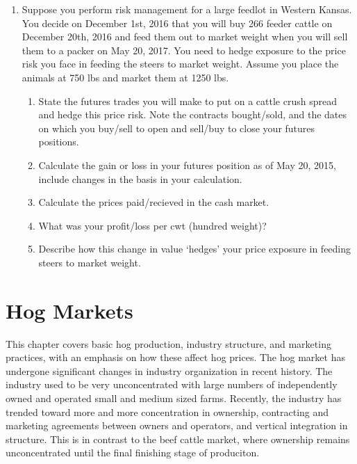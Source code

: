 \documentclass[
]{book}
\providecommand{\tightlist}{%
  \setlength{\itemsep}{0pt}\setlength{\parskip}{0pt}}
\begin{document}
\begin{enumerate}
\def\labelenumi{\arabic{enumi}.}
\item
  Suppose you perform risk management for a large feedlot in Western Kansas. You decide on December 1st, 2016 that you will buy 266 feeder cattle on December 20th, 2016 and feed them out to market weight when you will sell them to a packer on May 20, 2017. You need to hedge exposure to the price risk you face in feeding the steers to market weight. Assume you place the animals at 750 lbs and market them at 1250 lbs.

  \begin{enumerate}
  \def\labelenumii{\alph{enumii}.}
  \tightlist
  \item
    State the futures trades you will make to put on a cattle crush spread and hedge this price risk. Note the contracts bought/sold, and the dates on which you buy/sell to open and sell/buy to close your futures positions.
  \item
    Calculate the gain or loss in your futures position as of May 20, 2015, include changes in the basis in your calculation.
  \item
    Calculate the prices paid/recieved in the cash market.
  \item
    What was your profit/loss per cwt (hundred weight)?
  \item
    Describe how this change in value `hedges' your price exposure in feeding steers to market weight.
  \end{enumerate}
\end{enumerate}

\hypertarget{hog-markets}{%
\chapter{Hog Markets}\label{hog-markets}}

This chapter covers basic hog production, industry structure, and marketing practices, with an emphasis on how these affect hog prices. The hog market has undergone significant changes in industry organization in recent history. The industry used to be very unconcentrated with large numbers of independently owned and operated small and medium sized farms. Recently, the industry has trended toward more and more concentration in ownership, contracting and marketing agreements between owners and operators, and vertical integration in structure. This is in contrast to the beef cattle market, where ownership remains unconcentrated until the final finishing stage of produciton.
\end{document}
